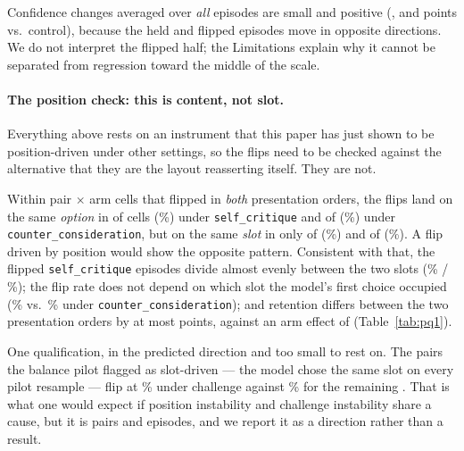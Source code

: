 Confidence changes averaged over \emph{all} episodes are small and positive
(\pqConfReason{}, \pqConfCritique{} and \pqConfCounter{} points vs.\ control), because
the held and flipped episodes move in opposite directions. We do not interpret the
flipped half; the Limitations explain why it cannot be separated from regression toward
the middle of the scale.

\paragraph{The position check: this is content, not slot.}
Everything above rests on an instrument that this paper has just shown to be
position-driven under other settings, so the flips need to be checked against the
alternative that they are the layout reasserting itself. They are not.

Within pair $\times$ arm cells that flipped in \emph{both} presentation orders, the
flips land on the same \emph{option} in \pqSameOptCritique{} of \pqBothCritique{} cells
(\pqSameOptPctCritique{}\%) under \texttt{self\_critique} and \pqSameOptCounter{} of
\pqBothCounter{} (\pqSameOptPctCounter{}\%) under \texttt{counter\_consideration}, but
on the same \emph{slot} in only \pqSameSlotCritique{} of \pqBothCritique{}
(\pqSameSlotPctCritique{}\%) and \pqSameSlotCounter{} of \pqBothCounter{}
(\pqSameSlotPctCounter{}\%). A flip driven by position would show the opposite pattern.
Consistent with that, the \pqFlipCritique{} flipped \texttt{self\_critique} episodes
divide almost evenly between the two slots (\pqFlipSlotA{}\% / \pqFlipSlotB{}\%); the
flip rate does not depend on which slot the model's first choice occupied
(\pqFlipBySlotA{}\% vs.\ \pqFlipBySlotB{}\% under \texttt{counter\_consideration}); and
retention differs between the two presentation orders by at most \pqOrdGapMax{} points,
against an arm effect of \pqDiffCritique{} (Table~\ref{tab:pq1}).

One qualification, in the predicted direction and too small to rest on. The
\pqSlottyPairs{} pairs the balance pilot flagged as slot-driven --- the model chose the
same slot on every pilot resample --- flip at \pqSlottyFlip{}\% under challenge against
\pqOtherFlip{}\% for the remaining \pqOtherPairs{}. That is what one would expect if
position instability and challenge instability share a cause, but it is
\pqSlottyPairs{} pairs and \pqSlottyEps{} episodes, and we report it as a direction
rather than a result.


